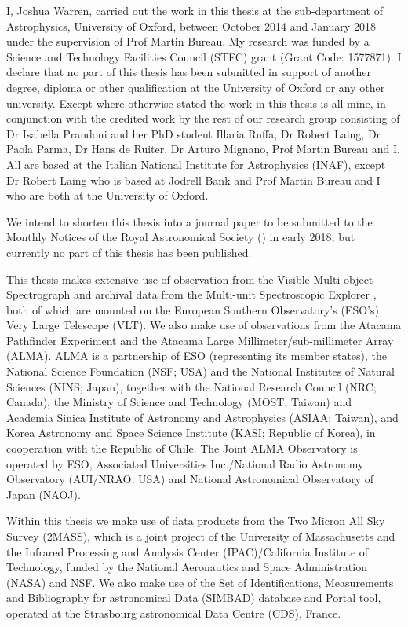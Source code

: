 \begin{originalitylong}
I, Joshua Warren, carried out the work in this thesis at the sub-department of Astrophysics, University of Oxford, between October 2014 and January 2018 under the supervision of Prof Martin Bureau. My research was funded by a Science and Technology Facilities Council (STFC) grant (Grant Code: 1577871). I declare that no part of this thesis has been submitted in support of another degree, diploma or other qualification at the University of Oxford or any other university. Except where otherwise stated the work in this thesis is all mine, in conjunction with the credited work by the rest of our research group consisting of Dr Isabella Prandoni and her PhD student Illaria Ruffa, Dr Robert Laing, Dr Paola Parma, Dr Hans de Ruiter, Dr Arturo Mignano, Prof Martin Bureau and I. All are based at the Italian National Institute for Astrophysics (INAF), except Dr Robert Laing who is based at Jodrell Bank and Prof Martin Bureau and I who are both at the University of Oxford.

We intend to shorten this thesis into a journal paper to be submitted to the Monthly Notices of the Royal Astronomical Society (\mnras) in early 2018, but currently no part of this thesis has been published. 

This thesis makes extensive use of observation from the Visible Multi-object Spectrograph \citep[VIMOS; ][]{LeFevre2003} and archival data from the Multi-unit Spectroscopic Explorer \citep[MUSE; ][]{Bacon2010}, both of which are mounted on the European Southern Observatory's (ESO's) Very Large Telescope (VLT). We also make use of observations from the Atacama Pathfinder Experiment \citep[APEX; ][]{Gusten2006} and the Atacama Large Millimeter/sub-millimeter Array (ALMA). ALMA is a partnership of ESO (representing its member states), the National Science Foundation (NSF; USA) and the National Institutes of Natural Sciences (NINS; Japan), together with the National Research Council (NRC; Canada), the Ministry of Science and Technology (MOST; Taiwan) and Academia Sinica Institute of Astronomy and Astrophysics (ASIAA; Taiwan), and Korea Astronomy and Space Science Institute (KASI; Republic of Korea), in cooperation with the Republic of Chile. The Joint ALMA Observatory is operated by ESO, Associated Universities Inc./National Radio Astronomy Observatory (AUI/NRAO; USA) and National Astronomical Observatory of Japan (NAOJ).

Within this thesis we make use of data products from the Two Micron All Sky Survey (2MASS), which is a joint project of the University of Massachusetts and the Infrared Processing and Analysis Center (IPAC)/California Institute of Technology, funded by the National Aeronautics and Space Administration (NASA) and NSF. We also make use of the Set of Identifications, Measurements and Bibliography for astronomical Data (SIMBAD) database and Portal tool, operated at the Strasbourg astronomical Data Centre (CDS), France. 


\end{originalitylong}

